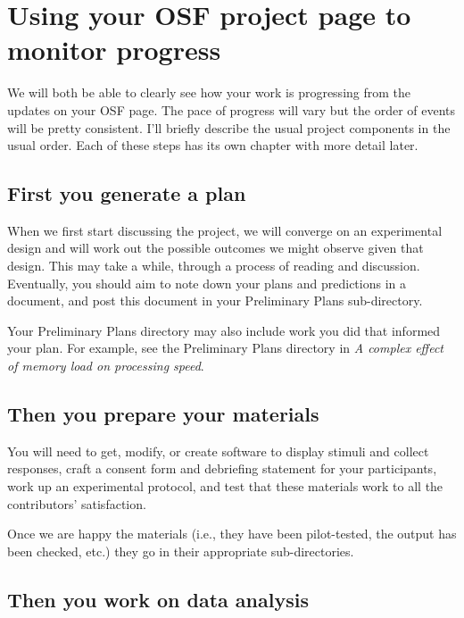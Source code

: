 \documentclass[12pt,]{book}
\theoremstyle{definition}
\theoremstyle{definition}
\theoremstyle{definition}
\theoremstyle{remark}
\begin{document}
\section{Using your OSF project page to monitor
progress}\label{using-your-osf-project-page-to-monitor-progress}

We will both be able to clearly see how your work is progressing from
the updates on your OSF page. The pace of progress will vary but the
order of events will be pretty consistent. I'll briefly describe the
usual project components in the usual order. Each of these steps has its
own chapter with more detail later.

\subsection{First you generate a plan}\label{first-you-generate-a-plan}

When we first start discussing the project, we will converge on an
experimental design and will work out the possible outcomes we might
observe given that design. This may take a while, through a process of
reading and discussion. Eventually, you should aim to note down your
plans and predictions in a document, and post this document in your
Preliminary Plans sub-directory.

Your Preliminary Plans directory may also include work you did that
informed your plan. For example, see the Preliminary Plans directory in
\emph{A complex effect of memory load on processing speed}.

\subsection{Then you prepare your
materials}\label{then-you-prepare-your-materials}

You will need to get, modify, or create software to display stimuli and
collect responses, craft a consent form and debriefing statement for
your participants, work up an experimental protocol, and test that these
materials work to all the contributors' satisfaction.

Once we are happy the materials (i.e., they have been pilot-tested, the
output has been checked, etc.) they go in their appropriate
sub-directories.

\subsection{Then you work on data
analysis}\label{then-you-work-on-data-analysis}
\end{document}
